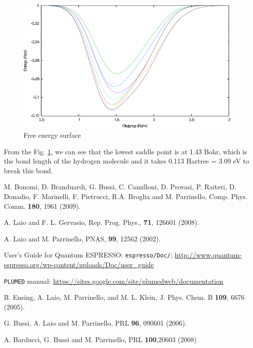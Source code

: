 \documentclass[12pt,a4paper]{article}
\def\qe{{\sc Quantum ESPRESSO}}
\begin{document}
\begin{figure}[htbp]
\begin{center}
\includegraphics[width=\textwidth]{./pic/hh_fes.pdf}
\caption{Free energy surface}
\label{FIG_hh_fes}
\end{center}
\end{figure}

From the Fig. \ref{FIG_hh_fes}, we can see that the lowest saddle point is at 1.43 Bohr, which is the bond length of the hydrogen molecule and it takes 0.113 Hartree = 3.09 eV to break this bond.

\newpage

\begin{thebibliography}{10}

 M. Bonomi, D. Branduardi, G. Bussi, C. Camilloni, D. Provasi, P. Raiteri, D. Donadio, F. Marinelli, F. Pietrucci, R.A. Broglia and M. Parrinello,  Comp. Phys. Comm. {\bf 180}, 1961 (2009).

 A. Laio and F. L. Gervasio, Rep. Prog. Phys., {\bf 71}, 126601 (2008).

 A. Laio and M. Parrinello, PNAS, {\bf 99}, 12562 (2002).

 User's Guide for \qe: \texttt{espresso/Doc/}; \href{http://www.quantum-espresso.org/wp-content/uploads/Doc/user\_guide/}{http://www.quantum-espresso.org/wp-content/uploads/Doc/user\_guide}

 \texttt{PLUMED} manual: \href{https://sites.google.com/site/plumedweb/documentation}{https://sites.google.com/site/plumedweb/documentation}

 B. Ensing, A. Laio, M. Parrinello, and M. L. Klein, J. Phys. Chem. B {\bf 109}, 6676 (2005).

 G. Bussi, A. Laio and M. Parrinello, PRL {\bf 96}, 090601 (2006).

 A. Barducci, G. Bussi and M. Parrinello, PRL {\bf 100},20603 (2008)

\end{thebibliography}
\end{document}
